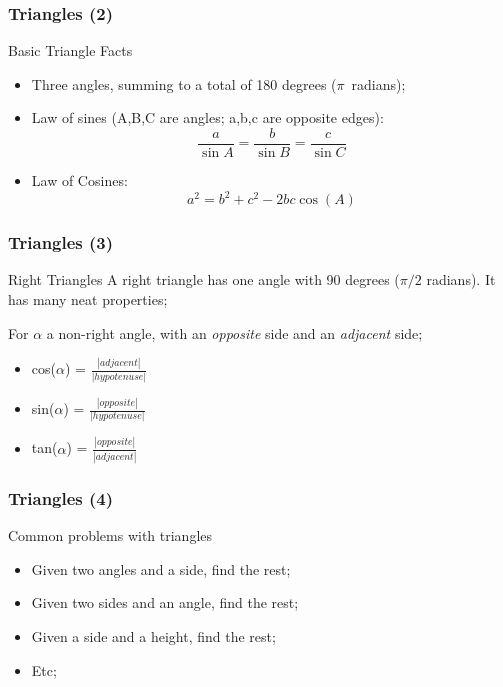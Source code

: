 \documentclass{beamer}
\begin{document}
\begin{frame}
  \frametitle{Triangles (2)}
  \begin{block}{Basic Triangle Facts}
    \begin{itemize}
    \item Three angles, summing to a total of 180 degrees ($\pi$~radians);
    \item Law of sines (A,B,C are angles; a,b,c are opposite edges):
      \begin{equation*}
        \frac{a}{\sin{A}} = \frac{b}{\sin{B}} = \frac{c}{\sin{C}}
      \end{equation*}
      \item Law of Cosines:
      \begin{equation*}
        a^2 = b^2+c^2 - 2bc\cos{(A)}
      \end{equation*} 
    \end{itemize}
  \end{block}
\end{frame}

\begin{frame}
  \frametitle{Triangles (3)}
  \begin{block}{Right Triangles}
    A right triangle has one angle with 90 degrees ($\pi/2$ radians). It has many neat properties;
  \end{block}
  For $\alpha$ a non-right angle, with an \emph{opposite} side and an \emph{adjacent} side;
    \begin{itemize}
    \item cos($\alpha$) = $\frac{|adjacent|}{|hypotenuse|}$
    \item sin($\alpha$) = $\frac{|opposite|}{|hypotenuse|}$
    \item tan($\alpha$) = $\frac{|opposite|}{|adjacent|}$
    \end{itemize}
\end{frame}

\begin{frame}
  \frametitle{Triangles (4)}
  \begin{block}{Common problems with triangles}
    \begin{itemize}
      \item Given two angles and a side, find the rest;
      \item Given two sides and an angle, find the rest;
      \item Given a side and a height, find the rest;
      \item Etc;
    \end{itemize}
  \end{block}
\end{frame}
\end{document}
